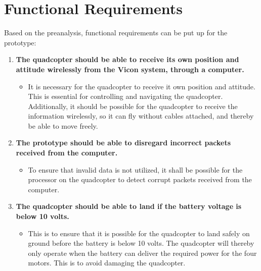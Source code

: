 \chapter{Functional Requirements}
\label{ch:functionalRequirements}
Based on the preanalysis, functional requirements can be put up for the prototype:


\begin{enumerate}[label=\textbf{\arabic*})]
\item \textbf{The quadcopter should be able to receive its own position and attitude wirelessly from the Vicon system, through a computer.}
\begin{itemize}
\item[] It is necessary for the quadcopter to receive it own position and attitude. This is essential for controlling and navigating the quadcopter. Additionally, it should be possible for the quadcopter to receive the information wirelessly, so it can fly without cables attached, and thereby be able to move freely.
\end{itemize}

\item \textbf{The prototype should be able to disregard incorrect packets received from the computer.}
\begin{itemize}
\item[] To ensure that invalid data is not utilized, it shall be possible for the processor on the quadcopter to detect corrupt packets received from the computer.
\end{itemize}

\item \textbf{The quadcopter should be able to land if the battery voltage is below 10 volts.}
\begin{itemize}
\item[] This is to ensure that it is possible for the quadcopter to land safely on ground before the battery is below 10 volts. The quadcopter will thereby only operate when the battery can deliver the required power for the four motors. This is to avoid damaging the quadcopter.
\end{itemize}


\end{enumerate}
